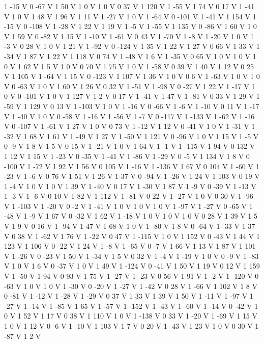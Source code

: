 {{1 -15 V
0 -67 V
1 50 V
1 0 V
1 0 V
0 37 V
1 120 V
1 -55 V
1 74 V
0 17 V
1 -41 V
1 0 V
1 48 V
1 96 V
1 11 V
1 -27 V
1 0 V
1 -64 V
0 -101 V
1 -41 V
1 154 V
1 -15 V
0 -108 V
1 -28 V
1 22 V
1 19 V
1 -5 V
1 -55 V
1 135 V
0 -86 V
1 60 V
1 0 V
1 59 V
0 -82 V
1 15 V
1 -10 V
1 -61 V
0 43 V
1 -70 V
1 -8 V
1 -20 V
1 0 V
1 -3 V
0 28 V
1 0 V
1 21 V
1 -92 V
0 -124 V
1 35 V
1 22 V
1 27 V
0 66 V
1 33 V
1 -34 V
1 87 V
1 22 V
1 118 V
0 74 V
1 -48 V
1 6 V
1 -35 V
0 65 V
1 0 V
1 0 V
1 0 V
1 62 V
1 5 V
1 0 V
0 70 V
1 75 V
1 0 V
1 -58 V
0 39 V
1 40 V
1 12 V
0 25 V
1 105 V
1 -64 V
1 15 V
0 -123 V
1 107 V
1 36 V
1 0 V
0 6 V
1 -63 V
1 0 V
1 0 V
0 -63 V
1 0 V
1 60 V
1 26 V
0 32 V
1 -51 V
1 -98 V
0 -27 V
1 22 V
1 -17 V
1 0 V
0 -101 V
1 0 V
1 127 V
1 2 V
0 17 V
1 -41 V
1 47 V
1 -81 V
0 33 V
1 29 V
1 -59 V
1 129 V
0 13 V
1 -103 V
1 0 V
1 -16 V
0 -66 V
1 -6 V
1 -10 V
0 11 V
1 -17 V
1 -40 V
1 0 V
0 -58 V
1 -16 V
1 -56 V
1 -7 V
0 -117 V
1 -133 V
1 -62 V
1 -16 V
0 -107 V
1 -61 V
1 27 V
1 0 V
0 73 V
1 -12 V
1 12 V
0 -41 V
1 0 V
1 -31 V
1 -32 V
1 68 V
1 61 V
1 -49 V
1 27 V
1 -50 V
1 121 V
0 -96 V
1 0 V
1 15 V
1 -5 V
0 -9 V
1 8 V
1 5 V
0 15 V
1 -21 V
1 0 V
1 64 V
1 -1 V
1 -115 V
1 94 V
0 132 V
1 12 V
1 15 V
1 -23 V
0 -35 V
1 -41 V
1 -86 V
1 -29 V
0 -5 V
1 134 V
1 8 V
0 -100 V
1 -72 V
1 92 V
1 56 V
0 105 V
1 -16 V
1 -136 V
1 67 V
0 104 V
1 -60 V
1 -23 V
1 -6 V
0 76 V
1 51 V
1 26 V
1 37 V
0 -94 V
1 -26 V
1 24 V
1 103 V
0 19 V
1 -4 V
1 0 V
1 0 V
1 39 V
1 -40 V
0 17 V
1 -30 V
1 87 V
1 -9 V
0 -39 V
1 -13 V
1 -3 V
1 -6 V
0 10 V
1 82 V
1 112 V
1 -81 V
0 22 V
1 -27 V
1 0 V
0 30 V
1 -96 V
1 -103 V
1 -20 V
0 -2 V
1 -41 V
1 0 V
1 0 V
1 0 V
1 -97 V
1 -27 V
0 -65 V
1 -48 V
1 -9 V
1 67 V
0 -32 V
1 62 V
1 -18 V
1 0 V
1 0 V
1 0 V
0 28 V
1 39 V
1 5 V
1 9 V
0 16 V
1 -94 V
1 47 V
1 68 V
1 0 V
1 -80 V
1 8 V
0 -64 V
1 -33 V
1 37 V
0 38 V
1 -62 V
1 76 V
1 -22 V
0 47 V
1 -115 V
1 0 V
1 152 V
0 -43 V
1 44 V
1 123 V
1 106 V
0 -22 V
1 24 V
1 -8 V
1 -65 V
0 -7 V
1 66 V
1 13 V
1 87 V
1 101 V
1 -26 V
0 -23 V
1 50 V
1 -34 V
1 5 V
0 32 V
1 -4 V
1 -19 V
1 0 V
0 -9 V
1 -83 V
1 0 V
1 6 V
0 -37 V
1 0 V
1 49 V
1 -124 V
0 -41 V
1 50 V
1 19 V
0 12 V
1 159 V
1 -50 V
1 94 V
0 93 V
1 75 V
1 -27 V
1 -23 V
0 56 V
1 91 V
1 -2 V
1 -120 V
0 -63 V
1 0 V
1 0 V
1 -30 V
0 -20 V
1 -27 V
1 -42 V
0 28 V
1 -66 V
1 102 V
1 8 V
0 -81 V
1 -12 V
1 -28 V
1 -29 V
0 37 V
1 33 V
1 39 V
1 50 V
1 -11 V
1 -97 V
1 -27 V
1 -14 V
1 -85 V
1 65 V
1 -57 V
1 -152 V
1 -43 V
1 -60 V
1 -14 V
0 -42 V
1 0 V
1 52 V
1 17 V
0 38 V
1 110 V
1 0 V
1 -138 V
0 33 V
1 -20 V
1 -69 V
1 15 V
1 0 V
1 12 V
0 -6 V
1 -10 V
1 103 V
1 7 V
0 20 V
1 -43 V
1 23 V
1 0 V
0 30 V
1 -87 V
1 2 V
}}
